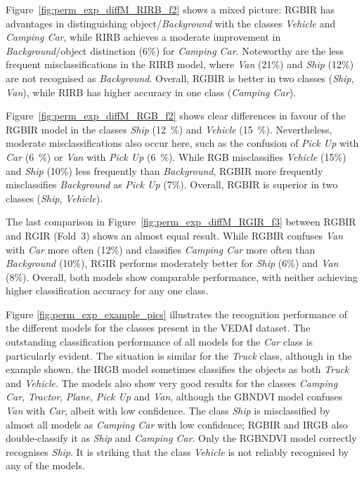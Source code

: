 Figure~\ref{fig:perm_exp_diffM_RIRB_f2} shows a mixed picture: \acrshort{RGBIR} has advantages in distinguishing object/\textit{Background} with the classes \textit{Vehicle} and \textit{Camping Car}, while \acrshort{RIRB} achieves a moderate improvement in \textit{Background}/object distinction (6\%) for \textit{Camping Car}. Noteworthy are the less frequent misclassifications in the \acrshort{RIRB} model, where \textit{Van} (21\%) and \textit{Ship} (12\%) are not recognised as \textit{Background}. Overall, \acrshort{RGBIR} is better in two classes (\textit{Ship}, \textit{Van}), while \acrshort{RIRB} has higher accuracy in one class (\textit{Camping Car}).




Figure~\ref{fig:perm_exp_diffM_RGB_f2} shows clear differences in favour of the \acrshort{RGBIR} model in the classes \textit{Ship} (12~\%) and \textit{Vehicle} (15~\%). Nevertheless, moderate misclassifications also occur here, such as the confusion of \textit{Pick Up} with \textit{Car} (6~\%) or \textit{Van} with \textit{Pick Up} (6~\%). While \acrshort{RGB} misclassifies \textit{Vehicle} (15\%) and \textit{Ship} (10\%) less frequently than \textit{Background}, \acrshort{RGBIR} more frequently misclassifies \textit{Background} as \textit{Pick Up} (7\%). Overall, \acrshort{RGBIR} is superior in two classes (\textit{Ship}, \textit{Vehicle}).



The last comparison in Figure~\ref{fig:perm_exp_diffM_RGIR_f3} between \acrshort{RGBIR} and \acrshort{RGIR} (Fold~3) shows an almost equal result. While \acrshort{RGBIR} confuses \textit{Van} with \textit{Car} more often (12\%) and classifies \textit{Camping Car} more often than \textit{Background} (10\%), \acrshort{RGIR} performs moderately better for \textit{Ship} (6\%) and \textit{Van} (8\%). Overall, both models show comparable performance, with neither achieving higher classification accuracy for any one class.

Figure \ref{fig:perm_exp_example_pics} illustrates the recognition performance of the different models for the classes present in the \acrshort{VEDAI} dataset. The outstanding classification performance of all models for the \textit{Car} class is particularly evident. The situation is similar for the \textit{Truck} class, although in the example shown, the \acrshort{IRGB} model sometimes classifies the objects as both \textit{Truck} and \textit{Vehicle}. The models also show very good results for the classes \textit{Camping Car}, \textit{Tractor}, \textit{Plane}, \textit{Pick Up} and \textit{Van}, although the \acrshort{GBNDVI} model confuses \textit{Van} with \textit{Car}, albeit with low confidence. The class \textit{Ship} is misclassified by almost all models as \textit{Camping Car} with low confidence; \acrshort{RGBIR} and \acrshort{IRGB} also double-classify it as \textit{Ship} and \textit{Camping Car}. Only the \acrshort{RGBNDVI} model correctly recognises \textit{Ship}. It is striking that the class \textit{Vehicle} is not reliably recognised by any of the models.


